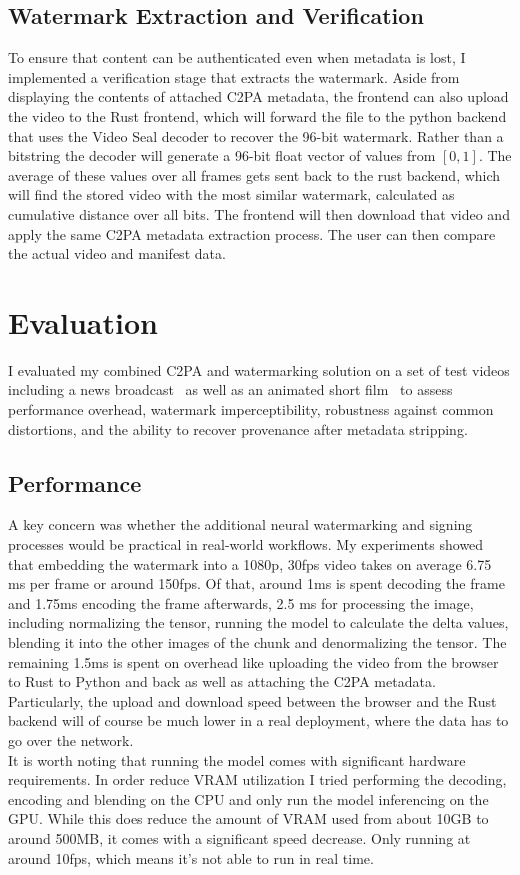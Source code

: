 \documentclass[12pt, technote]{IEEEtran}
\begin{document}
\subsection{Watermark Extraction and Verification}
To ensure that content can be authenticated even when metadata is lost, I implemented a verification stage that extracts the watermark. 
Aside from displaying the contents of attached C2PA metadata, the frontend can also upload the video to the Rust frontend, which will forward the file to the python backend that uses the Video Seal decoder to recover the 96-bit watermark. Rather than a bitstring the decoder will generate a 96-bit float vector of values from $[0,1]$. The average of these values over all frames gets sent back to the rust backend, which will find the stored video with the most similar watermark, calculated as cumulative distance over all bits.
The frontend will then download that video and apply the same C2PA metadata extraction process. The user can then compare the actual video and manifest data.

\section{Evaluation}
I evaluated my combined C2PA and watermarking solution on a set of test videos including a news broadcast~\cite{archiveTagesschauUhr} as well as an animated short film~\cite{blenderBuckBunny}  to assess performance overhead, watermark imperceptibility, robustness against common distortions, and the ability to recover provenance after metadata stripping.

\subsection{Performance}
A key concern was whether the additional neural watermarking and signing processes would be practical in real-world workflows. My experiments showed that embedding the watermark into a 1080p, 30fps video takes on average 6.75 ms per frame or around 150fps. Of that, around 1ms is spent decoding the frame and 1.75ms encoding the frame afterwards, 2.5 ms for processing the image, including normalizing the tensor, running the model to calculate the delta values, blending it into the other images of the chunk and denormalizing the tensor. The remaining 1.5ms is spent on overhead like uploading the video from the browser to Rust to Python and back as well as attaching the C2PA metadata. Particularly, the upload and download speed between the browser and the Rust backend will of course be much lower in a real deployment, where the data has to go over the network.\\
It is worth noting that running the model comes with significant hardware requirements. In order reduce VRAM utilization I tried performing the decoding, encoding and blending on the CPU and only run the model inferencing on the GPU. While this does reduce the amount of VRAM used from about 10GB to around 500MB, it comes with a significant speed decrease. Only running at around 10fps, which means it's not able to run in real time. 
\end{document}
